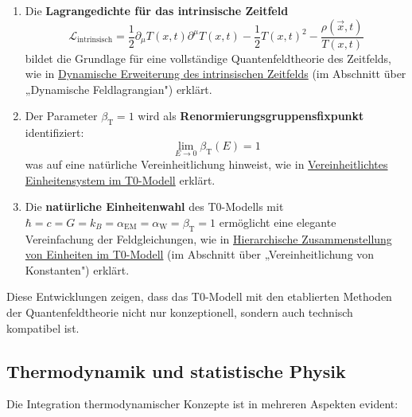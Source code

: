 \documentclass[12pt,a4paper]{article}
\newcommand{\Tfieldt}{T(x,t)}
\newcommand{\alphaEM}{\alpha_{\text{EM}}}
\newcommand{\alphaW}{\alpha_{\text{W}}}
\newcommand{\betaT}{\beta_{\text{T}}}
\newcommand{\vecx}{\vec{x}}
\begin{document}
	\begin{enumerate}
		\item Die \textbf{Lagrangedichte für das intrinsische Zeitfeld}
		\begin{equation}
			\mathcal{L}_{\text{intrinsisch}} = \frac{1}{2}\partial_{\mu}\Tfieldt\partial^{\mu}\Tfieldt - \frac{1}{2}\Tfieldt^2 - \frac{\rho(\vecx,t)}{\Tfieldt}
		\end{equation}
		bildet die Grundlage für eine vollständige Quantenfeldtheorie des Zeitfelds, wie in \href{https://github.com/jpascher/T0-Time-Mass-Duality/tree/main/2/pdf/English/DynamicTF-SchrodingerExtensions_En.pdf}{Dynamische Erweiterung des intrinsischen Zeitfelds} (im Abschnitt über „Dynamische Feldlagrangian") erklärt.
		
		\item Der Parameter $\betaT = 1$ wird als \textbf{Renormierungsgruppensfixpunkt} identifiziert:
		\begin{equation}
			\lim_{E \to 0} \betaT(E) = 1
		\end{equation}
		was auf eine natürliche Vereinheitlichung hinweist, wie in \href{https://github.com/jpascher/T0-Time-Mass-Duality/tree/main/2/pdf/English/Alpha1Beta1KonsistenzEn.pdf}{Vereinheitlichtes Einheitensystem im T0-Modell} erklärt.
		
		\item Die \textbf{natürliche Einheitenwahl} des T0-Modells mit $\hbar = c = G = k_B = \alphaEM = \alphaW = \betaT = 1$ ermöglicht eine elegante Vereinfachung der Feldgleichungen, wie in \href{https://github.com/jpascher/T0-Time-Mass-Duality/tree/main/2/pdf/English/NatEinheitenSystematikEn.pdf}{Hierarchische Zusammenstellung von Einheiten im T0-Modell} (im Abschnitt über „Vereinheitlichung von Konstanten") erklärt.
	\end{enumerate}
	
	Diese Entwicklungen zeigen, dass das T0-Modell mit den etablierten Methoden der Quantenfeldtheorie nicht nur konzeptionell, sondern auch technisch kompatibel ist.
	
	\subsection{Thermodynamik und statistische Physik}
	\label{subsec:thermodynamics}
	
	Die Integration thermodynamischer Konzepte ist in mehreren Aspekten evident:
	
\end{document}

